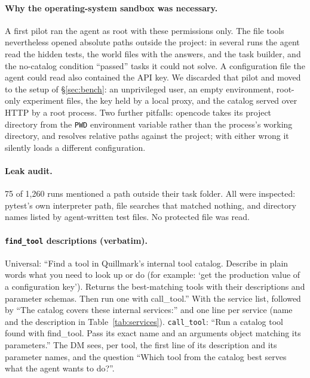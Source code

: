 \paragraph{Why the operating-system sandbox was necessary.} A first pilot ran the agent as root with these
permissions only. The file tools nevertheless opened absolute paths outside the project: in several runs the
agent read the hidden tests, the world files with the answers, and the task builder, and the no-catalog
condition ``passed'' tasks it could not solve. A configuration file the agent could read also contained the
API key. We discarded that pilot and moved to the setup of \S\ref{sec:bench}: an unprivileged user, an empty
environment, root-only experiment files, the key held by a local proxy, and the catalog served over HTTP by a
root process. Two further pitfalls: opencode takes its project directory from the \texttt{PWD} environment
variable rather than the process's working directory, and resolves relative paths against the project; with
either wrong it silently loads a different configuration.

\paragraph{Leak audit.} 75 of 1{,}260 runs mentioned a path outside their task folder. All were inspected:
pytest's own interpreter path, file searches that matched nothing, and directory names listed by agent-written
test files. No protected file was read.

\paragraph{\texttt{find\_tool} descriptions (verbatim).} Universal: ``Find a tool in Quillmark's internal tool
catalog. Describe in plain words what you need to look up or do (for example: `get the production value of a
configuration key'). Returns the best-matching tools with their descriptions and parameter schemas. Then run
one with call\_tool.'' With the service list, followed by ``The catalog covers these internal services:'' and
one line per service (name and the description in Table~\ref{tab:services}). \texttt{call\_tool}: ``Run a
catalog tool found with find\_tool. Pass its exact name and an arguments object matching its parameters.'' The
DM sees, per tool, the first line of its description and its parameter names, and the question ``Which tool
from the catalog best serves what the agent wants to do?''.

